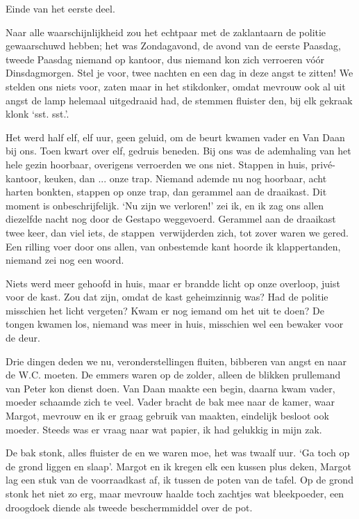 \documentclass{book}
\begin{document}
Einde van het eerste deel.

Naar alle waarschijnlijkheid zou het echtpaar met de zaklantaarn de politie
gewaarschuwd hebben; het was Zondagavond, de avond van de eerste Paasdag, tweede
Paasdag niemand op kantoor, dus niemand kon zich verroeren vóór Dinsdagmorgen.
Stel je voor, twee nachten en een dag in deze angst te zitten! We stelden ons
niets voor, zaten maar in het stikdonker, omdat mevrouw ook al uit angst de lamp
helemaal uitgedraaid had, de stemmen fluister den, bij elk gekraak klonk `sst.
sst.'.

Het werd half elf, elf uur, geen geluid, om de beurt kwamen vader en Van Daan
bij ons. Toen kwart over elf, gedruis beneden. Bij ons was de ademhaling van het
hele gezin hoorbaar, overigens verroerden we ons niet. Stappen in huis,
privé-kantoor, keuken, dan ... onze trap. Niemand ademde nu nog hoorbaar, acht
harten bonkten, stappen op onze trap, dan gerammel aan de draaikast. Dit moment
is onbeschrijfelijk. `Nu zijn we verloren!' zei ik, en ik zag ons allen
diezelfde nacht nog door de Gestapo weggevoerd. Gerammel aan de draaikast twee
keer, dan viel iets, de stappen~verwijderden zich, tot zover waren we gered. Een
rilling voer door ons allen, van onbestemde kant hoorde ik klappertanden,
niemand zei nog een woord.

Niets werd meer gehoofd in huis, maar er brandde licht op onze overloop, juist
voor de kast. Zou dat zijn, omdat de kast geheimzinnig was? Had de politie
misschien het licht vergeten? Kwam er nog iemand om het uit te doen? De tongen
kwamen los, niemand was meer in huis, misschien wel een bewaker voor de deur.

Drie dingen deden we nu, veronderstellingen fluiten, bibberen van angst en naar
de W.C. moeten. De emmers waren op de zolder, alleen de blikken prullemand van
Peter kon dienst doen. Van Daan maakte een begin, daarna kwam vader, moeder
schaamde zich te veel. Vader bracht de bak mee naar de kamer, waar Margot,
mevrouw en ik er graag gebruik van maakten, eindelijk besloot ook moeder. Steeds
was er vraag naar wat papier, ik had gelukkig in mijn zak.

De bak stonk, alles fluister de en we waren moe, het was twaalf uur. `Ga toch op
de grond liggen en slaap'. Margot en ik kregen elk een kussen plus deken, Margot
lag een stuk van de voorraadkast af, ik tussen de poten van de tafel. Op de
grond stonk het niet zo erg, maar mevrouw haalde toch zachtjes wat bleekpoeder,
een droogdoek diende als tweede beschermmiddel over de pot.
\end{document}
